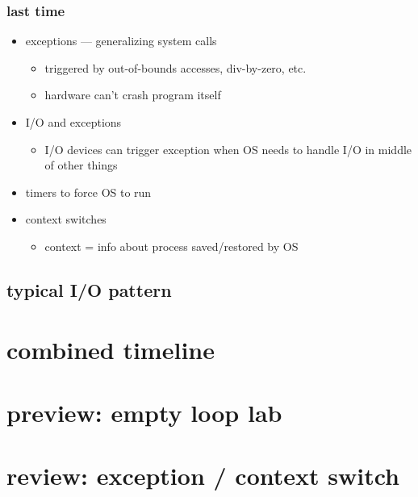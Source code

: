\date{}
\title{}
\date{}

\begin{frame}
    \titlepage
\end{frame}



\begin{frame}
\frametitle{last time}
\begin{itemize}
\item exceptions --- generalizing system calls
    \begin{itemize}
    \item triggered by out-of-bounds accesses, div-by-zero, etc.
    \item hardware can't crash program itself
    \end{itemize}
\item I/O and exceptions
    \begin{itemize}
    \item I/O devices can trigger exception when OS needs to handle I/O in middle of other things
    \end{itemize}
\item timers to force OS to run
\item context switches
    \begin{itemize}
    \item context = info about process saved/restored by OS
    \end{itemize}
\end{itemize}
\end{frame}

\subsection{typical I/O pattern}




\section{combined timeline}


\section{preview: empty loop lab}


\section{review: exception / context switch}


